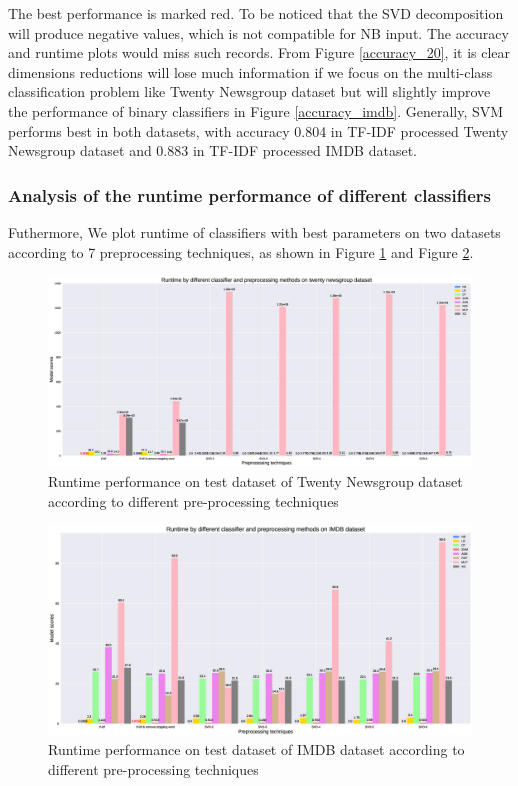 \documentclass[11pt]{scrartcl}
\begin{document}
The best performance is marked red. To be noticed that the SVD decomposition will produce negative values, which is not compatible for NB input. The accuracy and runtime plots would miss such records. From Figure \ref{accuracy_20}, it is clear dimensions reductions will lose much information if we focus on the multi-class classification problem like Twenty Newsgroup dataset but will slightly improve the performance of binary classifiers in Figure \ref{accuracy_imdb}. Generally, SVM performs best in both datasets, with accuracy 0.804 in TF-IDF processed Twenty Newsgroup dataset and 0.883 in TF-IDF processed IMDB dataset.

\subsubsection*{Analysis of the runtime performance of different classifiers}
Futhermore, We plot runtime of classifiers with best parameters on two datasets according to 7 preprocessing techniques, as shown in Figure \ref{runtime_20} and Figure \ref{runtime_imdb}.

\begin{figure}[H]
	\centering
	\includegraphics[width=0.9\linewidth]{fig/model_runtime_20.eps}
	\caption{Runtime performance on test dataset of Twenty Newsgroup dataset according to different pre-processing techniques}
	\label{runtime_20}
\end{figure}

\begin{figure}[H]
	\centering
	\includegraphics[width=0.9\linewidth]{fig/model_runtime_imdb.eps}
	\caption{Runtime performance on test dataset of IMDB dataset according to different pre-processing techniques}
	\label{runtime_imdb}
\end{figure}
\end{document}
